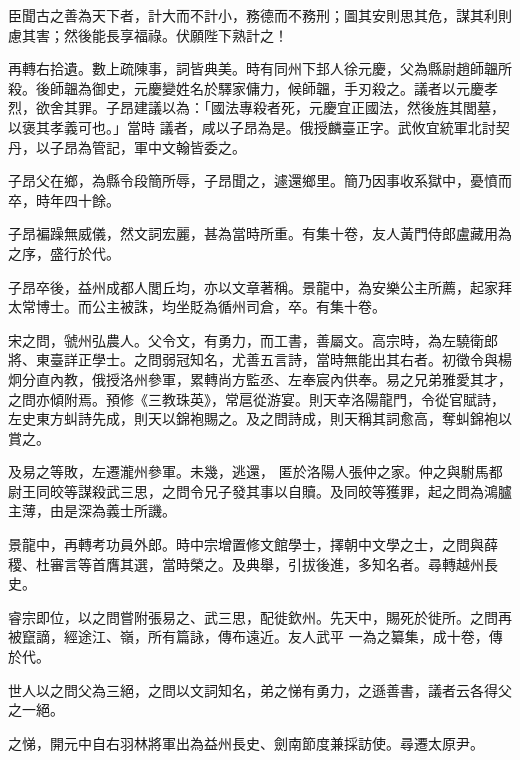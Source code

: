 \begin{pinyinscope}
 臣聞古之善為天下者，計大而不計小，務德而不務刑；圖其安則思其危，謀其利則慮其害；然後能長享福祿。伏願陛下熟計之！



 再轉右拾遺。數上疏陳事，詞皆典美。時有同州下邽人徐元慶，父為縣尉趙師韞所殺。後師韞為御史，元慶變姓名於驛家傭力，候師韞，手刃殺之。議者以元慶孝烈，欲舍其罪。子昂建議以為：「國法專殺者死，元慶宜正國法，然後旌其閭墓，以褒其孝義可也。」當時
 議者，咸以子昂為是。俄授麟臺正字。武攸宜統軍北討契丹，以子昂為管記，軍中文翰皆委之。



 子昂父在鄉，為縣令段簡所辱，子昂聞之，遽還鄉里。簡乃因事收系獄中，憂憤而卒，時年四十餘。



 子昂褊躁無威儀，然文詞宏麗，甚為當時所重。有集十卷，友人黃門侍郎盧藏用為之序，盛行於代。



 子昂卒後，益州成都人閭丘均，亦以文章著稱。景龍中，為安樂公主所薦，起家拜太常博士。而公主被誅，均坐貶為循州司倉，卒。有集十卷。



 宋之問，虢州弘農人。父令文，有勇力，而工書，善屬文。高宗時，為左驍衛郎將、東臺詳正學士。之問弱冠知名，尤善五言詩，當時無能出其右者。初徵令與楊炯分直內教，俄授洛州參軍，累轉尚方監丞、左奉宸內供奉。易之兄弟雅愛其才，之問亦傾附焉。預修《三教珠英》，常扈從游宴。則天幸洛陽龍門，令從官賦詩，左史東方虯詩先成，則天以錦袍賜之。及之問詩成，則天稱其詞愈高，奪虯錦袍以賞之。



 及易之等敗，左遷瀧州參軍。未幾，逃還，
 匿於洛陽人張仲之家。仲之與駙馬都尉王同皎等謀殺武三思，之問令兄子發其事以自贖。及同皎等獲罪，起之問為鴻臚主薄，由是深為義士所譏。



 景龍中，再轉考功員外郎。時中宗增置修文館學士，擇朝中文學之士，之問與薛稷、杜審言等首膺其選，當時榮之。及典舉，引拔後進，多知名者。尋轉越州長史。



 睿宗即位，以之問嘗附張易之、武三思，配徙欽州。先天中，賜死於徙所。之問再被竄謫，經途江、嶺，所有篇詠，傳布遠近。友人武平
 一為之纂集，成十卷，傳於代。



 世人以之問父為三絕，之問以文詞知名，弟之悌有勇力，之遜善書，議者云各得父之一絕。



 之悌，開元中自右羽林將軍出為益州長史、劍南節度兼採訪使。尋遷太原尹。




\end{pinyinscope}
